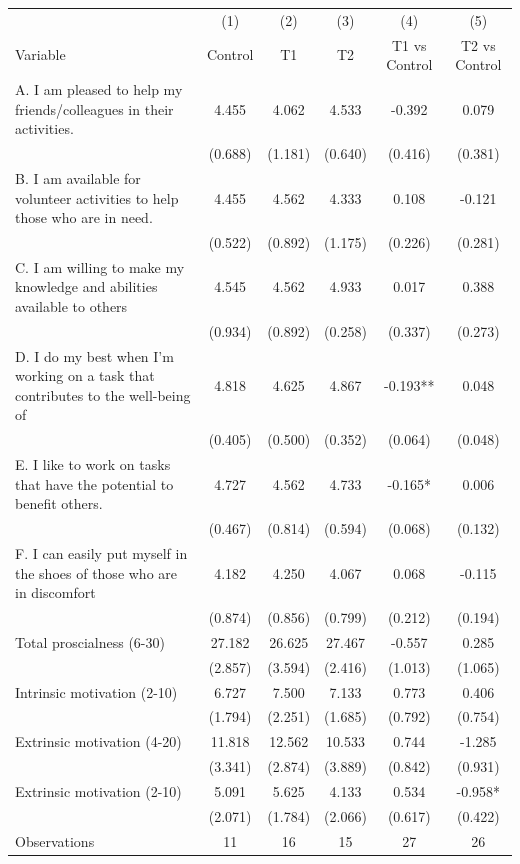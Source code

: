 \begin{tabular}{l*{5}c}
\hline\hline
 & (1) & (2) & (3) & (4) & (5) \\
Variable & Control & T1 & T2 & T1 vs Control & T2 vs Control \\
\hline
A. I am pleased to help my friends/colleagues in their activities.&4.455&4.062&4.533&-0.392&0.079\\
&(0.688)&(1.181)&(0.640)&(0.416)&(0.381)\\
B. I am available for volunteer activities to help those who are in need.&4.455&4.562&4.333&0.108&-0.121\\
&(0.522)&(0.892)&(1.175)&(0.226)&(0.281)\\
C. I am willing to make my knowledge and abilities available to others&4.545&4.562&4.933&0.017&0.388\\
&(0.934)&(0.892)&(0.258)&(0.337)&(0.273)\\
D. I do my best when I’m working on a task that contributes to the well-being of&4.818&4.625&4.867&-0.193**&0.048\\
&(0.405)&(0.500)&(0.352)&(0.064)&(0.048)\\
E. I like to work on tasks that have the potential to benefit others.&4.727&4.562&4.733&-0.165*&0.006\\
&(0.467)&(0.814)&(0.594)&(0.068)&(0.132)\\
F. I can easily put myself in the shoes of those who are in discomfort&4.182&4.250&4.067&0.068&-0.115\\
&(0.874)&(0.856)&(0.799)&(0.212)&(0.194)\\
Total proscialness (6-30)&27.182&26.625&27.467&-0.557&0.285\\
&(2.857)&(3.594)&(2.416)&(1.013)&(1.065)\\
Intrinsic motivation (2-10)&6.727&7.500&7.133&0.773&0.406\\
&(1.794)&(2.251)&(1.685)&(0.792)&(0.754)\\
Extrinsic motivation (4-20)&11.818&12.562&10.533&0.744&-1.285\\
&(3.341)&(2.874)&(3.889)&(0.842)&(0.931)\\
Extrinsic motivation (2-10)&5.091&5.625&4.133&0.534&-0.958*\\
&(2.071)&(1.784)&(2.066)&(0.617)&(0.422)\\
\hline
Observations & 11 & 16 & 15 & 27 & 26 \\
\hline\hline
\end{tabular}
